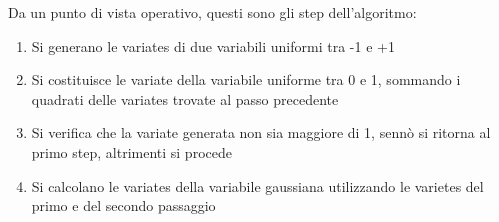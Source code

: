 Da un punto di vista operativo, questi sono gli step dell'algoritmo: 

\begin{enumerate}
    \item Si generano le variates di due variabili uniformi tra -1 e +1 
    \item Si costituisce le variate della variabile uniforme tra 0 e 1, sommando i quadrati delle variates trovate al passo precedente 
    \item Si verifica che la variate generata non sia maggiore di 1, sennò si ritorna al primo step, altrimenti si procede 
    \item Si calcolano le variates della variabile gaussiana utilizzando le varietes del primo e del secondo passaggio
\end{enumerate}


\newpage 
